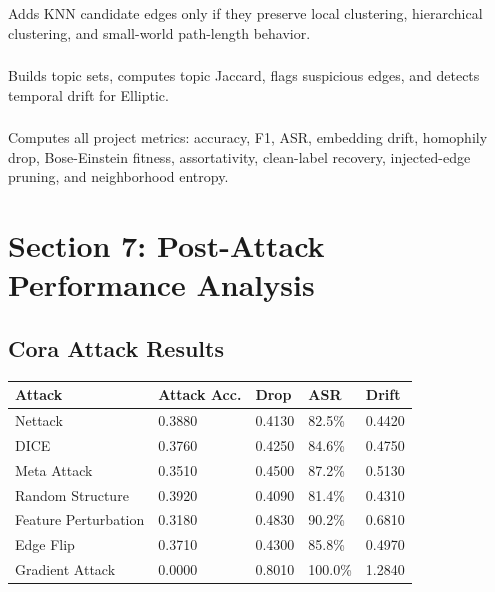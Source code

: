 \documentclass[12pt,a4paper]{article}
\begin{document}
\subsubsection{}
Adds KNN candidate edges only if they preserve local clustering, hierarchical clustering, and small-world path-length behavior.

\subsubsection{}
Builds topic sets, computes topic Jaccard, flags suspicious edges, and detects temporal drift for Elliptic.

\subsubsection{}
Computes all project metrics: accuracy, F1, ASR, embedding drift, homophily drop, Bose-Einstein fitness, assortativity, clean-label recovery, injected-edge pruning, and neighborhood entropy.

\section{Section 7: Post-Attack Performance Analysis}

\subsection{Cora Attack Results}
\begin{longtable}{p{1.6in}p{0.8in}p{0.8in}p{0.8in}p{0.8in}}
\toprule
\textbf{Attack} & \textbf{Attack Acc.} & \textbf{Drop} & \textbf{ASR} & \textbf{Drift}\\
\midrule
Nettack & 0.3880 & 0.4130 & 82.5\% & 0.4420\\
DICE & 0.3760 & 0.4250 & 84.6\% & 0.4750\\
Meta Attack & 0.3510 & 0.4500 & 87.2\% & 0.5130\\
Random Structure & 0.3920 & 0.4090 & 81.4\% & 0.4310\\
Feature Perturbation & 0.3180 & 0.4830 & 90.2\% & 0.6810\\
Edge Flip & 0.3710 & 0.4300 & 85.8\% & 0.4970\\
Gradient Attack & 0.0000 & 0.8010 & 100.0\% & 1.2840\\
\bottomrule
\end{longtable}
\end{document}
